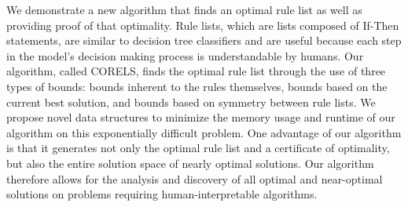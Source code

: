 
We demonstrate a new algorithm that finds an optimal rule list as well as providing proof of that optimality. Rule lists, which are lists composed of If-Then statements, are similar to decision tree classifiers and are useful because each step in the model's decision making process is understandable by humans. Our algorithm, called CORELS, finds the optimal rule list through the use of three types of bounds: bounds inherent to the rules themselves, bounds based on the current best solution, and bounds based on symmetry between rule lists. We propose novel data structures to minimize the memory usage and runtime of our algorithm on this exponentially difficult problem. One advantage of our algorithm is that it generates not only the optimal rule list and a certificate of optimality, but also the entire solution space of nearly optimal solutions. Our algorithm therefore allows for the analysis and discovery of all optimal and near-optimal solutions on problems requiring human-interpretable algorithms.